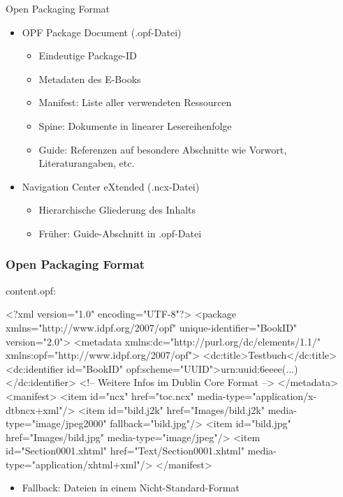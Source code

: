 \documentclass[hyperref={pdfpagelabels=false}]{beamer}
\begin{document}
\begin{frame}{Open Packaging Format}
	\begin{itemize}
		\item OPF Package Document (.opf-Datei)
		\begin{itemize}
			\item Eindeutige Package-ID
			\item Metadaten des E-Books
			\item Manifest: Liste aller verwendeten Ressourcen
			\item Spine: Dokumente in linearer Lesereihenfolge
			\item Guide: Referenzen auf besondere Abschnitte wie Vorwort, Literaturangaben, etc.
		\end{itemize}
		\item Navigation Center eXtended (.ncx-Datei)
		\begin{itemize}
			\item Hierarchische Gliederung des Inhalts
			\item Früher: Guide-Abschnitt in .opf-Datei
		\end{itemize}
	\end{itemize}
\end{frame}

\begin{frame}[fragile]
\frametitle{Open Packaging Format}
content.opf:
\begin{xml}
<?xml version="1.0" encoding="UTF-8"?>
<package xmlns="http://www.idpf.org/2007/opf" unique-identifier="BookID" version="2.0">
  <metadata xmlns:dc="http://purl.org/dc/elements/1.1/" xmlns:opf="http://www.idpf.org/2007/opf">
      <dc:title>Testbuch</dc:title>
      <dc:identifier id="BookID" opf:scheme="UUID">urn:uuid:6eeee(...)</dc:identifier>
      <!-- Weitere Infos im Dublin Core Format -->
  </metadata>
  <manifest>
    <item id="ncx" href="toc.ncx" media-type="application/x-dtbncx+xml"/>
    <item id="bild.j2k" href="Images/bild.j2k" media-type="image/jpeg2000" fallback="bild.jpg"/>
    <item id="bild.jpg" href="Images/bild.jpg" media-type="image/jpeg"/>
    <item id="Section0001.xhtml" href="Text/Section0001.xhtml" media-type="application/xhtml+xml"/>
  </manifest>
\end{xml}
	\begin{itemize}
		\item Fallback: Dateien in einem Nicht-Standard-Format
	\end{itemize}
\end{frame}
\end{document}
